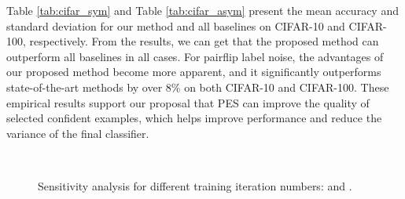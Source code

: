 \documentclass[11pt]{article}
\begin{document}
\begin{table}[!tp]
\fontsize{8.5}{10}\selectfont
\centering
\caption{Comparison with state-of-the-art methods with semi-supervised learning on CIFAR-10 and CIFAR-100 with instance-dependent and pairflip label noise from different levels. The mean and standard deviation are computed over three runs.}
\vspace{5pt}
\label{tab:cifar_asym}
\end{table}




Table \ref{tab:cifar_sym} and Table \ref{tab:cifar_asym} present the mean accuracy and standard deviation for our method and all baselines on CIFAR-10 and CIFAR-100, respectively. From the results, we can get that the proposed method can outperform all baselines in all cases. For pairflip label noise, the advantages of our proposed method become more apparent, and it significantly outperforms state-of-the-art methods by over 8\% on both CIFAR-10 and CIFAR-100. These empirical results support our proposal that PES can improve the quality of selected confident examples, which helps improve performance and reduce the variance of the final classifier. \\


\begin{wrapfigure}{r}{0.3\textwidth}
\centering
\vspace{-20pt}
\\
\caption{Sensitivity analysis for different training iteration numbers:  and .} 
\vspace{-40pt}
\end{wrapfigure}
\end{document}
